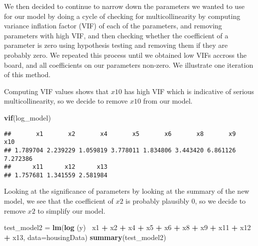 \documentclass[]{article}
\newenvironment{Shaded}{\begin{snugshade}}{\end{snugshade}}
\newcommand{\KeywordTok}[1]{\textcolor[rgb]{0.13,0.29,0.53}{\textbf{#1}}}
\newcommand{\DataTypeTok}[1]{\textcolor[rgb]{0.13,0.29,0.53}{#1}}
\newcommand{\StringTok}[1]{\textcolor[rgb]{0.31,0.60,0.02}{#1}}
\newcommand{\OperatorTok}[1]{\textcolor[rgb]{0.81,0.36,0.00}{\textbf{#1}}}
\newcommand{\NormalTok}[1]{#1}
\begin{document}
We then decided to continue to narrow down the parameters we wanted to
use for our model by doing a cycle of checking for multicollinearity by
computing variance inflation factor (VIF) of each of the parameters, and
removing parameters with high VIF, and then checking whether the
coefficient of a parameter is zero using hypothesis testing and removing
them if they are probably zero. We repeated this process until we
obtained low VIFs accross the board, and all coefficients on our
parameters non-zero. We illustrate one iteration of this method.

Computing VIF values shows that \(x10\) has high VIF which is indicative
of serious multicollinearity, so we decide to remove \(x10\) from our
model.

\begin{Shaded}
\begin{Highlighting}[]
\KeywordTok{vif}\NormalTok{(log_model)}
\end{Highlighting}
\end{Shaded}

\begin{verbatim}
##       x1       x2       x4       x5       x6       x8       x9      x10 
## 1.789704 2.239229 1.059819 3.778011 1.834806 3.443420 6.861126 7.272386 
##      x11      x12      x13 
## 1.757681 1.341559 2.581984
\end{verbatim}

Looking at the significance of parameters by looking at the summary of
the new model, we see that the coefficient of \(x2\) is probably
plausibly 0, so we decide to remove \(x2\) to simplify our model.

\begin{Shaded}
\begin{Highlighting}[]
\NormalTok{test_model2 =}\StringTok{ }\KeywordTok{lm}\NormalTok{(}\KeywordTok{log}\NormalTok{ (y)}\OperatorTok{~}\StringTok{ }\NormalTok{x1 }\OperatorTok{+}\StringTok{ }\NormalTok{x2 }\OperatorTok{+}\StringTok{ }\NormalTok{x4 }\OperatorTok{+}\StringTok{ }\NormalTok{x5 }\OperatorTok{+}\StringTok{ }\NormalTok{x6 }\OperatorTok{+}\StringTok{ }\NormalTok{x8 }\OperatorTok{+}\StringTok{ }\NormalTok{x9 }\OperatorTok{+}\StringTok{ }\NormalTok{x11 }\OperatorTok{+}\StringTok{ }\NormalTok{x12 }\OperatorTok{+}\StringTok{ }\NormalTok{x13, }\DataTypeTok{data=}\NormalTok{housingData)}
\KeywordTok{summary}\NormalTok{(test_model2)}
\end{Highlighting}
\end{Shaded}
\end{document}
